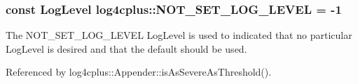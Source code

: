 \hypertarget{namespacelog4cplus_a63227df3dcb3420d748bbcb1f5b357c6}{
\subsubsection[{N\-O\-T\-\_\-\-S\-E\-T\-\_\-\-L\-O\-G\-\_\-\-L\-E\-V\-E\-L}]{\setlength{\rightskip}{0pt plus 5cm}const {\bf Log\-Level} log4cplus\-::\-N\-O\-T\-\_\-\-S\-E\-T\-\_\-\-L\-O\-G\-\_\-\-L\-E\-V\-E\-L = -\/1}}\label{namespacelog4cplus_a63227df3dcb3420d748bbcb1f5b357c6}
The {\ttfamily N\-O\-T\-\_\-\-S\-E\-T\-\_\-\-L\-O\-G\-\_\-\-L\-E\-V\-E\-L} Log\-Level is used to indicated that no particular Log\-Level is desired and that the default should be used. 

Referenced by log4cplus\-::\-Appender\-::is\-As\-Severe\-As\-Threshold().

